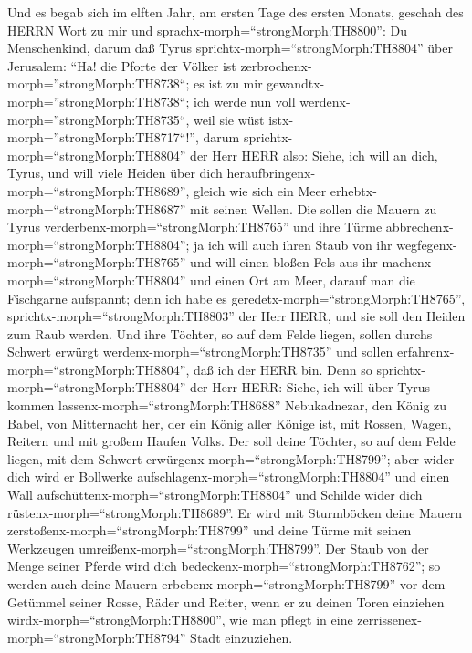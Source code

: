  Und es begab sich im elften Jahr, am ersten Tage des ersten
Monats, geschah des HERRN Wort zu mir und
sprachx-morph=``strongMorph:TH8800'':  Du Menschenkind,
darum daß Tyrus sprichtx-morph=``strongMorph:TH8804'' über Jerusalem:
``Ha! die Pforte der Völker ist
zerbrochenx-morph=''strongMorph:TH8738``; es ist zu mir
gewandtx-morph=''strongMorph:TH8738``; ich werde nun voll
werdenx-morph=''strongMorph:TH8735``, weil sie wüst
istx-morph=''strongMorph:TH8717``!'',  darum
sprichtx-morph=``strongMorph:TH8804'' der Herr HERR also: Siehe, ich
will an dich, Tyrus, und will viele Heiden über dich
heraufbringenx-morph=``strongMorph:TH8689'', gleich wie sich ein Meer
erhebtx-morph=``strongMorph:TH8687'' mit seinen Wellen.  Die
sollen die Mauern zu Tyrus verderbenx-morph=``strongMorph:TH8765'' und
ihre Türme abbrechenx-morph=``strongMorph:TH8804''; ja ich will auch
ihren Staub von ihr wegfegenx-morph=``strongMorph:TH8765'' und will
einen bloßen Fels aus ihr machenx-morph=``strongMorph:TH8804''
 und einen Ort am Meer, darauf man die Fischgarne aufspannt;
denn ich habe es geredetx-morph=``strongMorph:TH8765'',
sprichtx-morph=``strongMorph:TH8803'' der Herr HERR, und sie soll den
Heiden zum Raub werden.  Und ihre Töchter, so auf dem Felde
liegen, sollen durchs Schwert erwürgt
werdenx-morph=``strongMorph:TH8735'' und sollen
erfahrenx-morph=``strongMorph:TH8804'', daß ich der HERR bin.
 Denn so sprichtx-morph=``strongMorph:TH8804'' der Herr
HERR: Siehe, ich will über Tyrus kommen
lassenx-morph=``strongMorph:TH8688'' Nebukadnezar, den König zu Babel,
von Mitternacht her, der ein König aller Könige ist, mit Rossen, Wagen,
Reitern und mit großem Haufen Volks.  Der soll deine
Töchter, so auf dem Felde liegen, mit dem Schwert
erwürgenx-morph=``strongMorph:TH8799''; aber wider dich wird er
Bollwerke aufschlagenx-morph=``strongMorph:TH8804'' und einen Wall
aufschüttenx-morph=``strongMorph:TH8804'' und Schilde wider dich
rüstenx-morph=``strongMorph:TH8689''.  Er wird mit
Sturmböcken deine Mauern zerstoßenx-morph=``strongMorph:TH8799'' und
deine Türme mit seinen Werkzeugen
umreißenx-morph=``strongMorph:TH8799''.  Der Staub von der
Menge seiner Pferde wird dich bedeckenx-morph=``strongMorph:TH8762''; so
werden auch deine Mauern erbebenx-morph=``strongMorph:TH8799'' vor dem
Getümmel seiner Rosse, Räder und Reiter, wenn er zu deinen Toren
einziehen wirdx-morph=``strongMorph:TH8800'', wie man pflegt in eine
zerrissenex-morph=``strongMorph:TH8794'' Stadt einzuziehen.
